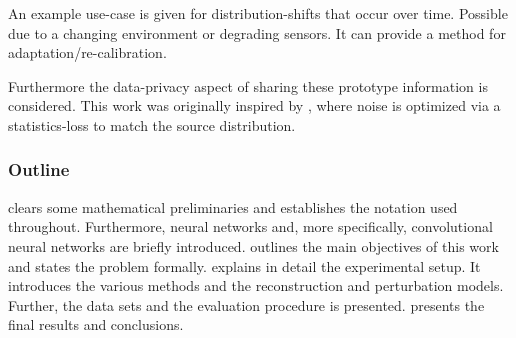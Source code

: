 An example use-case is given for distribution-shifts that occur over time.
Possible due to a changing environment or degrading sensors.
It can provide a method for adaptation/re-calibration.


Furthermore the data-privacy aspect of sharing these prototype information is considered.
This work was originally inspired by \cite{DeepInversion}, where noise is
optimized via a statistics-loss to match the source distribution.


\subsubsection{Outline}
 clears some mathematical preliminaries and establishes the notation 
used throughout. Furthermore, neural networks and, 
more specifically, convolutional neural networks are briefly introduced.
 outlines the main objectives of this work and 
states the problem formally.
 explains in detail the experimental setup.
It introduces the various methods and the reconstruction and perturbation models.
Further, the data sets and the evaluation procedure is presented.
 presents the final results and conclusions.
